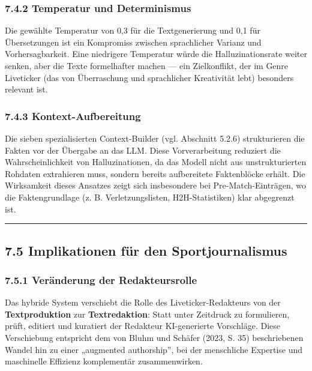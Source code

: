 \subsubsection{7.4.2 Temperatur und
Determinismus}\label{temperatur-und-determinismus}

Die gewählte Temperatur von 0,3 für die Textgenerierung und 0,1 für
Übersetzungen ist ein Kompromiss zwischen sprachlicher Varianz und
Vorhersagbarkeit. Eine niedrigere Temperatur würde die
Halluzinationsrate weiter senken, aber die Texte formelhafter machen ---
ein Zielkonflikt, der im Genre Liveticker (das von Überraschung und
sprachlicher Kreativität lebt) besonders relevant ist.

\subsubsection{7.4.3 Kontext-Aufbereitung}\label{kontext-aufbereitung}

Die sieben spezialisierten Context-Builder (vgl. Abschnitt 5.2.6)
strukturieren die Fakten vor der Übergabe an das LLM. Diese
Vorverarbeitung reduziert die Wahrscheinlichkeit von Halluzinationen, da
das Modell nicht aus unstrukturierten Rohdaten extrahieren muss, sondern
bereits aufbereitete Faktenblöcke erhält. Die Wirksamkeit dieses
Ansatzes zeigt sich insbesondere bei Pre-Match-Einträgen, wo die
Faktengrundlage (z. B. Verletzungslisten, H2H-Statistiken) klar
abgegrenzt ist.

\begin{center}\rule{0.5\linewidth}{0.5pt}\end{center}

\subsection{7.5 Implikationen für den
Sportjournalismus}\label{implikationen-fuxfcr-den-sportjournalismus}

\subsubsection{7.5.1 Veränderung der
Redakteursrolle}\label{veruxe4nderung-der-redakteursrolle}

Das hybride System verschiebt die Rolle des Liveticker-Redakteurs von
der \textbf{Textproduktion} zur \textbf{Textredaktion}: Statt unter
Zeitdruck zu formulieren, prüft, editiert und kuratiert der Redakteur
KI-generierte Vorschläge. Diese Verschiebung entspricht dem von Bluhm
und Schäfer (2023, S. 35) beschriebenen Wandel hin zu einer „augmented
authorship'', bei der menschliche Expertise und maschinelle Effizienz
komplementär zusammenwirken.

